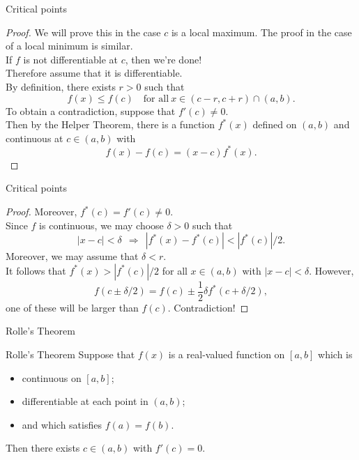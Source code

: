 \documentclass{beamer}
\begin{document}
\begin{frame}{Critical points}
\begin{proof}
\pause
We will prove this in the case $c$ is a local maximum.  The proof in the case of a local minimum is similar.\\
\pause
If $f$ is not differentiable at $c$, then we're done!\\
\pause
Therefore assume that it is differentiable.\\
\pause
By definition, there exists $r>0$ such that
$$f(x)\leq f(c)\quad\text{for all}\ x\in (c-r,c+r)\cap (a,b).$$
\pause
To obtain a contradiction, suppose that $f'(c)\neq 0$.\\
\pause
Then by the Helper Theorem, there is a function $f^*(x)$ defined on $(a,b)$ and continuous at $c\in (a,b)$ with
$$f(x)-f(c) = (x-c)f^*(x).$$
\end{proof}
\end{frame}

\begin{frame}{Critical points}
\begin{proof}
Moreover, $f^*(c) = f'(c)\neq 0$.\\
\pause
Since $f$ is continuous, we may choose $\delta > 0$ such that
$$|x-c| < \delta\ \ \Rightarrow\ \ |f^*(x) - f^*(c)| < |f^*(c)|/2.$$
\pause
Moreover, we may assume that $\delta < r$.\\
\pause
It follows that $f^*(x) > |f^*(c)|/2$ for all $x\in (a,b)$ with $|x-c|<\delta$.
\pause
However,
$$f(c\pm \delta/2) = f(c) \pm \frac{1}{2}\delta f^*(c+\delta/2),$$
one of these will be larger than $f(c)$.  \pause Contradiction!
\end{proof}
\end{frame}

\begin{frame}{Rolle's Theorem}
\begin{thm}{Rolle's Theorem}
Suppose that $f(x)$ is a real-valued function on $[a,b]$ which is
\begin{itemize}
\pause
\item continuous on $[a,b]$;
\pause
\item differentiable at each point in $(a,b)$;
\pause
\item and which satisfies $f(a) = f(b)$.
\end{itemize}
\pause
Then there exists $c\in (a,b)$ with $f'(c) = 0$.
\end{thm}
\end{frame}
\end{document}
